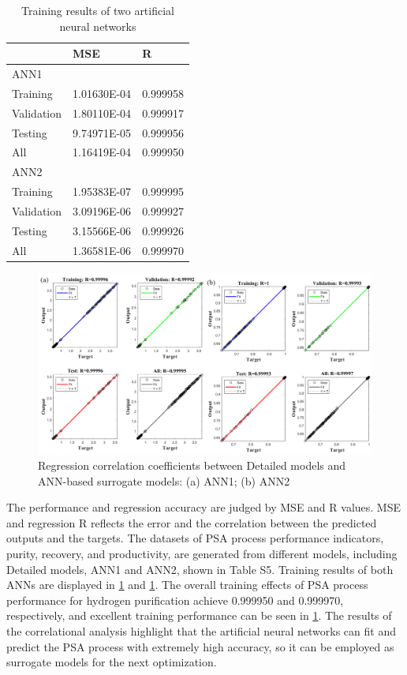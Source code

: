 \documentclass[preprint,12pt]{elsarticle}
\begin{document}
\begin{table}[]
	\centering
	\caption{Training results of two artificial neural networks}
	\begin{tabular}{lll}
		\toprule
           & MSE         & R        \\
           \midrule
			\multicolumn{3}{l}{ANN1}            \\
			Training   & 1.01630E-04 & 0.999958 \\
			Validation & 1.80110E-04 & 0.999917 \\
			Testing    & 9.74971E-05 & 0.999956 \\
			All        & 1.16419E-04 & 0.999950 \\
			\multicolumn{3}{l}{ANN2}            \\
			Training   & 1.95383E-07 & 0.999995 \\
			Validation & 3.09196E-06 & 0.999927 \\
			Testing    & 3.15566E-06 & 0.999926 \\
			All        & 1.36581E-06 & 0.999970\\
		\bottomrule
	\end{tabular}
\label{TABLE:5}
\end{table}
\begin{figure}
	\centering
	\includegraphics[width=1\textwidth]{figs/Fig7.pdf}
	\caption{Regression correlation coefficients between Detailed models and ANN-based surrogate models: (a) ANN1; (b) ANN2}
	\label{FIG:7}
\end{figure}

The performance and regression accuracy are judged by MSE and R values. MSE and regression R reflects the error and the correlation between the predicted outputs and the targets. The datasets of PSA process performance indicators, purity, recovery, and productivity, are generated from different models, including Detailed models, ANN1 and ANN2, shown in Table S5. Training results of both ANNs are displayed in \cref{TABLE:5} and \cref{FIG:7}. The overall training effects of PSA process performance for hydrogen purification achieve 0.999950 and 0.999970, respectively, and excellent training performance can be seen in \cref{FIG:7}. The results of the correlational analysis highlight that the artificial neural networks can fit and predict the PSA process with extremely high accuracy, so it can be employed as surrogate models for the next optimization.
\end{document}
